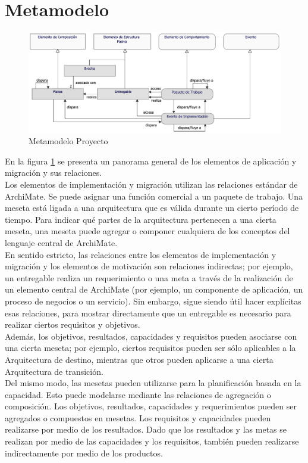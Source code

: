 \section{Metamodelo}
\begin{figure}[h!]
	\centering
	\includegraphics[width=0.9\linewidth]{imgs/meta/Proyecto}
	\caption{Metamodelo Proyecto}
	\label{fig:mProyecto}
\end{figure}

En la figura \ref{fig:mProyecto} se presenta un panorama general de los elementos de aplicación y migración y sus relaciones.\\

Los elementos de implementación y migración utilizan las relaciones estándar de ArchiMate. Se puede asignar una función comercial a un paquete de trabajo.
Una meseta está ligada a una arquitectura que es válida durante un cierto período de tiempo. Para indicar qué partes de la arquitectura pertenecen a una cierta meseta, una meseta puede agregar o componer cualquiera de los conceptos del lenguaje central de ArchiMate.\\

En sentido estricto, las relaciones entre los elementos de implementación y migración y los elementos de motivación son relaciones indirectas; por ejemplo, un entregable realiza un requerimiento o una meta a través de la realización de un elemento central de ArchiMate (por ejemplo, un componente de aplicación, un proceso de negocios o un servicio). Sin embargo, sigue siendo útil hacer explícitas esas relaciones, para mostrar directamente que un entregable es necesario para realizar ciertos requisitos y objetivos.\\

Además, los objetivos, resultados, capacidades y requisitos pueden asociarse con una cierta meseta; por ejemplo, ciertos requisitos pueden ser sólo aplicables a la Arquitectura de destino, mientras que otros pueden aplicarse a una cierta Arquitectura de transición.\\

Del mismo modo, las mesetas pueden utilizarse para la planificación basada en la capacidad. Esto puede modelarse mediante las relaciones de agregación o composición. Los objetivos, resultados, capacidades y requerimientos pueden ser agregados o compuestos en mesetas. Los requisitos y capacidades pueden realizarse por medio de los resultados. Dado que los resultados y las metas se realizan por medio de las capacidades y los requisitos, también pueden realizarse indirectamente por medio de los productos.

\newpage

\newpage

\newpage
